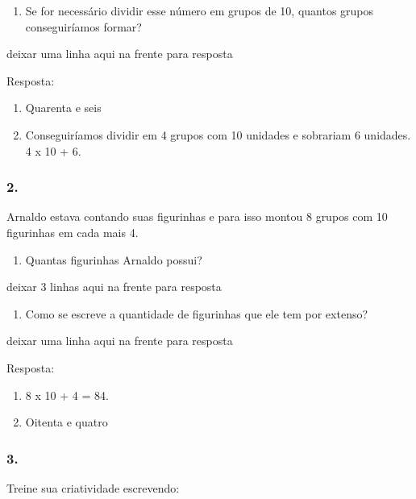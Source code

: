 \begin{enumerate}
\def\labelenumi{\alph{enumi})}
\item
  Se for necessário dividir esse número em grupos de 10, quantos grupos
  conseguiríamos formar?
\end{enumerate}

deixar uma linha aqui na frente para resposta

Resposta:

\begin{enumerate}
\def\labelenumi{\alph{enumi})}
\item
  Quarenta e seis
\item
  Conseguiríamos dividir em 4 grupos com 10 unidades e sobrariam 6
  unidades. 4 x 10 + 6.
\end{enumerate}

\subsubsection{2.}\label{section-1}

Arnaldo estava contando suas figurinhas e para isso montou 8 grupos com
10 figurinhas em cada mais 4.

\begin{enumerate}
\def\labelenumi{\alph{enumi})}
\item
  Quantas figurinhas Arnaldo possui?
\end{enumerate}

deixar 3 linhas aqui na frente para resposta

\begin{enumerate}
\def\labelenumi{\alph{enumi})}
\item
  Como se escreve a quantidade de figurinhas que ele tem por extenso?
\end{enumerate}

deixar uma linha aqui na frente para resposta

Resposta:

\begin{enumerate}
\def\labelenumi{\alph{enumi})}
\item
  8 x 10 + 4 = 84.
\item
  Oitenta e quatro
\end{enumerate}

\subsubsection{3.}\label{section-2}

Treine sua criatividade escrevendo:

